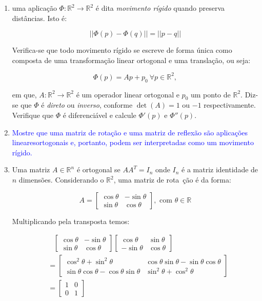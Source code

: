 \documentclass[12pt,letterpaper]{article}
\newcommand{\real}{\mathbb{R}}
\newcommand{\rr}{\mathbb{R}^2}
\newcommand{\rn}{\mathbb{R}^n}
\newcommand{\ex}[1]{\textcolor{blue}{\textbf{Exercício #1}}}
\newcommand{\sol}[1]{\textbf{Solução #1}}
\begin{document}
\begin{enumerate}
	\item[\ex{5}] uma aplicação $\Phi:\rr\to\rr$ é dita \textit{movimento rígido} quando preserva distâncias. Isto é:
	
	$$||\Phi(p)-\Phi(q)||=||p-q||$$
	
	Verifica-se que todo movimento rígido se escreve de forma única como composta de uma transformação linear ortogonal e uma translação, ou seja:
	
	$$\Phi(p)=Ap+p_0~\forall p\in\rr,$$
	
	em que, $A:\rr\to\rr$ é um operador linear ortogonal e $p_0$ um ponto de $\rr$. Diz-se que $\Phi$ é \textit{direto} ou \textit{inverso}, conforme $\det(A)=1$ ou $-1$ respectivamente. Verifique que $\Phi$ é diferenciável e calcule $\Phi'(p)$ e $\Phi''(p)$.
	
	\item[\ex{6}] \textcolor{blue}{Mostre que uma matriz de rotação e uma matriz de reflexão são aplicações linearesortogonais e, portanto, podem ser interpretadas como um movimento rígido.}
	
	\item[\sol{6}] Uma matriz $A\in\rn$ é ortogonal se $AA^T=I_n$ onde $I_n$ é a matriz identidade de $n$ dimensões. Considerando o $\rr$, uma matriz de rota~ção é da forma:
	
	$$A=\begin{bmatrix}
		\cos \theta &-\sin\theta\\
		\sin\theta &\cos\theta
	\end{bmatrix},\text{ com }\theta\in\real$$

	Multiplicando pela transposta temos:
	
	\begin{align*}
		&~~~\,\begin{bmatrix}
			\cos \theta &-\sin\theta\\
			\sin\theta &\cos\theta
		\end{bmatrix}\begin{bmatrix}
		\cos \theta &\sin\theta\\
		-\sin\theta &\cos\theta
	\end{bmatrix}\\&=\begin{bmatrix}
	\cos^2 \theta +\sin^2\theta&\cos\theta\sin\theta-\sin\theta\cos\theta\\
	\sin\theta\cos\theta-\cos\theta\sin\theta &\sin^2\theta+\cos^2\theta
\end{bmatrix}\\&=\begin{bmatrix}
1 &0\\
0 &1
\end{bmatrix}
	\end{align*}


\end{enumerate}
\end{document}
